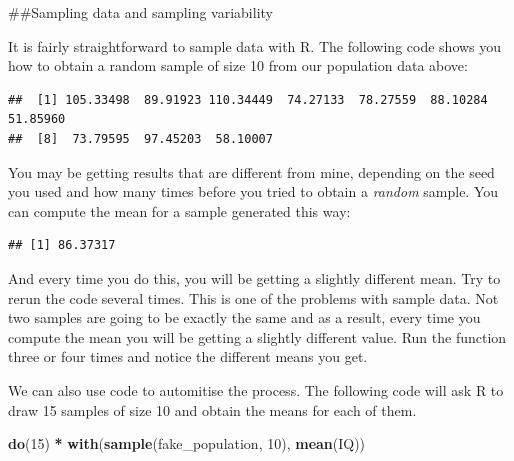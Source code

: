 \documentclass[]{book}
\newenvironment{Shaded}{\begin{snugshade}}{\end{snugshade}}
\newcommand{\CommentTok}[1]{\textcolor[rgb]{0.56,0.35,0.01}{\textit{#1}}}
\newcommand{\DecValTok}[1]{\textcolor[rgb]{0.00,0.00,0.81}{#1}}
\newcommand{\KeywordTok}[1]{\textcolor[rgb]{0.13,0.29,0.53}{\textbf{#1}}}
\newcommand{\NormalTok}[1]{#1}
\newcommand{\OperatorTok}[1]{\textcolor[rgb]{0.81,0.36,0.00}{\textbf{#1}}}
\newcommand{\StringTok}[1]{\textcolor[rgb]{0.31,0.60,0.02}{#1}}
\theoremstyle{definition}
\theoremstyle{definition}
\theoremstyle{definition}
\theoremstyle{remark}
\begin{document}
\#\#Sampling data and sampling variability

It is fairly straightforward to sample data with R. The following code
shows you how to obtain a random sample of size 10 from our population
data above:

\begin{Shaded}
\end{Shaded}

\begin{verbatim}
##  [1] 105.33498  89.91923 110.34449  74.27133  78.27559  88.10284  51.85960
##  [8]  73.79595  97.45203  58.10007
\end{verbatim}

You may be getting results that are different from mine, depending on
the seed you used and how many times before you tried to obtain a
\emph{random} sample. You can compute the mean for a sample generated
this way:

\begin{Shaded}
\end{Shaded}

\begin{verbatim}
## [1] 86.37317
\end{verbatim}

And every time you do this, you will be getting a slightly different
mean. Try to rerun the code several times. This is one of the problems
with sample data. Not two samples are going to be exactly the same and
as a result, every time you compute the mean you will be getting a
slightly different value. Run the function three or four times and
notice the different means you get.

We can also use code to automitise the process. The following code will
ask R to draw 15 samples of size 10 and obtain the means for each of
them.

\begin{Shaded}
\begin{Highlighting}[]
\KeywordTok{do}\NormalTok{(}\DecValTok{15}\NormalTok{) }\OperatorTok{*}\StringTok{ }\KeywordTok{with}\NormalTok{(}\KeywordTok{sample}\NormalTok{(fake_population, }\DecValTok{10}\NormalTok{), }\KeywordTok{mean}\NormalTok{(IQ))}
\end{Highlighting}
\end{Shaded}
\end{document}

